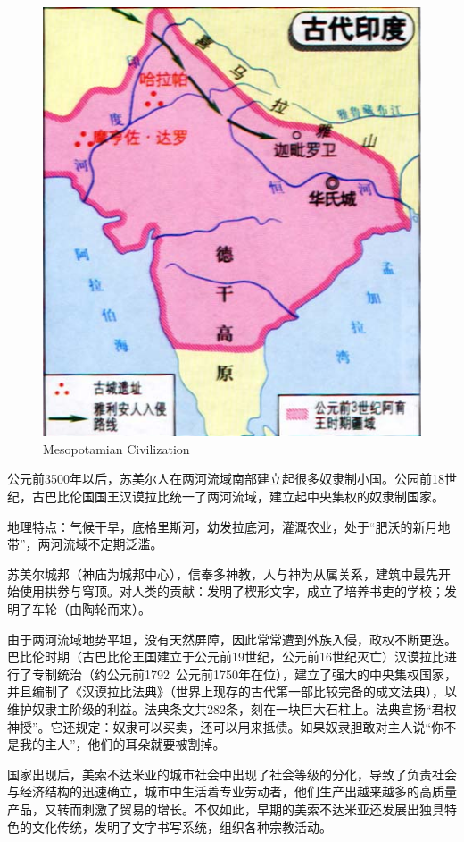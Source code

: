 \begin{figure}[thbp!]
    \centering
    \includegraphics[width=0.8\linewidth]{figure/india.jpg}
    \caption{Mesopotamian Civilization}
    \label{fig:backphoto}
    \end{figure}

公元前3500年以后，苏美尔人在两河流域南部建立起很多奴隶制小国。公园前18世纪，古巴比伦国国王汉谟拉比统一了两河流域，建立起中央集权的奴隶制国家。

地理特点：气候干旱，底格里斯河，幼发拉底河，灌溉农业，处于“肥沃的新月地带”，两河流域不定期泛滥。

苏美尔城邦（神庙为城邦中心），信奉多神教，人与神为从属关系，建筑中最先开始使用拱劵与穹顶。对人类的贡献：发明了楔形文字，成立了培养书吏的学校；发明了车轮（由陶轮而来）。

由于两河流域地势平坦，没有天然屏障，因此常常遭到外族入侵，政权不断更迭。巴比伦时期（古巴比伦王国建立于公元前19世纪，公元前16世纪灭亡）汉谟拉比进行了专制统治（约公元前1792~公元前1750年在位），建立了强大的中央集权国家，并且编制了《汉谟拉比法典》（世界上现存的古代第一部比较完备的成文法典），以维护奴隶主阶级的利益。法典条文共282条，刻在一块巨大石柱上。法典宣扬“君权神授”。它还规定：奴隶可以买卖，还可以用来抵债。如果奴隶胆敢对主人说“你不是我的主人”，他们的耳朵就要被割掉。

国家出现后，美索不达米亚的城市社会中出现了社会等级的分化，导致了负责社会与经济结构的迅速确立，城市中生活着专业劳动者，他们生产出越来越多的高质量产品，又转而刺激了贸易的增长。不仅如此，早期的美索不达米亚还发展出独具特色的文化传统，发明了文字书写系统，组织各种宗教活动。

